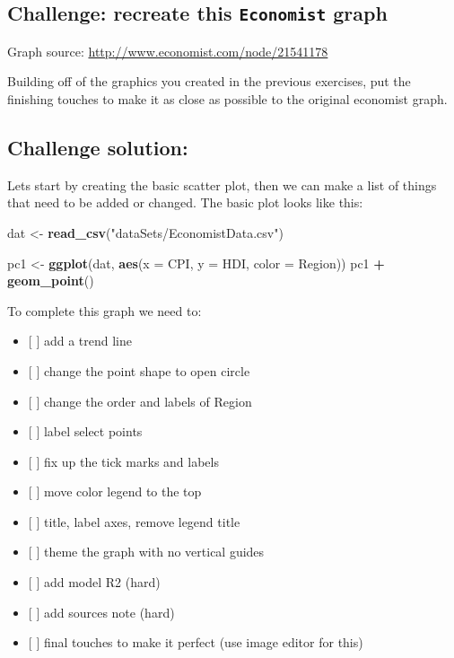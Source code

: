 \documentclass[]{book}
\newenvironment{Shaded}{\begin{snugshade}}{\end{snugshade}}
\newcommand{\KeywordTok}[1]{\textcolor[rgb]{0.13,0.29,0.53}{\textbf{#1}}}
\newcommand{\DataTypeTok}[1]{\textcolor[rgb]{0.13,0.29,0.53}{#1}}
\newcommand{\StringTok}[1]{\textcolor[rgb]{0.31,0.60,0.02}{#1}}
\newcommand{\OperatorTok}[1]{\textcolor[rgb]{0.81,0.36,0.00}{\textbf{#1}}}
\newcommand{\NormalTok}[1]{#1}
\providecommand{\tightlist}{%
  \setlength{\itemsep}{0pt}\setlength{\parskip}{0pt}}
\begin{document}
\subsection{\texorpdfstring{Challenge: recreate this \texttt{Economist}
graph}{Challenge: recreate this Economist graph}}\label{challenge-recreate-this-economist-graph}

Graph source: \url{http://www.economist.com/node/21541178}

Building off of the graphics you created in the previous exercises, put
the finishing touches to make it as close as possible to the original
economist graph.

\subsection{Challenge solution:}\label{challenge-solution}

Lets start by creating the basic scatter plot, then we can make a list
of things that need to be added or changed. The basic plot looks like
this:

\begin{Shaded}
\begin{Highlighting}[]
\NormalTok{dat <-}\StringTok{ }\KeywordTok{read_csv}\NormalTok{(}\StringTok{"dataSets/EconomistData.csv"}\NormalTok{)}

\NormalTok{pc1 <-}\StringTok{ }\KeywordTok{ggplot}\NormalTok{(dat, }\KeywordTok{aes}\NormalTok{(}\DataTypeTok{x =}\NormalTok{ CPI, }\DataTypeTok{y =}\NormalTok{ HDI, }\DataTypeTok{color =}\NormalTok{ Region))}
\NormalTok{pc1 }\OperatorTok{+}\StringTok{ }\KeywordTok{geom_point}\NormalTok{()}
\end{Highlighting}
\end{Shaded}

To complete this graph we need to:

\begin{itemize}
\tightlist
\item
  {[} {]} add a trend line
\item
  {[} {]} change the point shape to open circle
\item
  {[} {]} change the order and labels of Region
\item
  {[} {]} label select points
\item
  {[} {]} fix up the tick marks and labels
\item
  {[} {]} move color legend to the top
\item
  {[} {]} title, label axes, remove legend title
\item
  {[} {]} theme the graph with no vertical guides
\item
  {[} {]} add model R2 (hard)
\item
  {[} {]} add sources note (hard)
\item
  {[} {]} final touches to make it perfect (use image editor for this)
\end{itemize}
\end{document}
